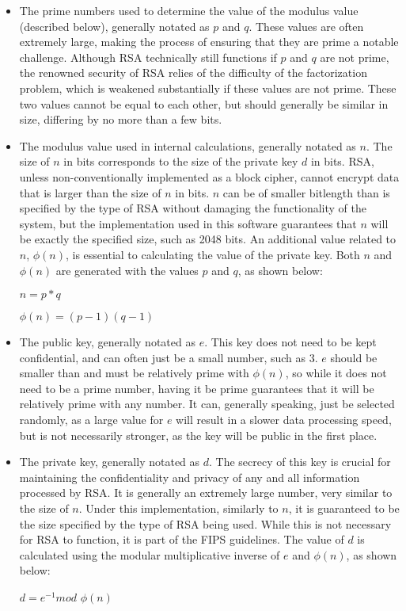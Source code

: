 \documentclass[11pt]{article}
\begin{document}
\begin{itemize}
\item
{
The prime numbers used to determine the value of the modulus value (described below), generally notated as $p$ and $q$. These values are often extremely large, making the process of ensuring that they are prime a notable challenge. Although RSA technically still functions if $p$ and $q$ are not prime, the renowned security of RSA relies of the difficulty of the factorization problem, which is weakened substantially if these values are not prime. These two values cannot be equal to each other, but should generally be similar in size, differing by no more than a few bits.
}
\item
{
The modulus value used in internal calculations, generally notated as $n$. The size of $n$ in bits corresponds to the size of the private key $d$ in bits. RSA, unless non-conventionally implemented as a block cipher, cannot encrypt data that is larger than the size of $n$ in bits. $n$ can be of smaller bitlength than is specified by the type of RSA without damaging the functionality of the system, but the implementation used in this software guarantees that $n$ will be exactly the specified size, such as 2048 bits. An additional value related to $n$, $\phi(n)$, is essential to calculating the value of the private key. Both $n$ and $\phi(n)$ are generated with the values $p$ and $q$, as shown below:
\begin{center}
$n = p * q$

$\phi(n) = (p - 1)(q - 1)$
\end{center}
}

\item
{
The public key, generally notated as $e$. This key does not need to be kept confidential, and can often just be a small number, such as $3$. $e$ should be smaller than and must be relatively prime with $\phi(n)$, so while it does not need to be a prime number, having it be prime guarantees that it will be relatively prime with any number. It can, generally speaking, just be selected randomly, as a large value for $e$ will result in a slower data processing speed, but is not necessarily stronger, as the key will be public in the first place.
}
\item
{
The private key, generally notated as $d$. The secrecy of this key is crucial for maintaining the confidentiality and privacy of any and all information processed by RSA. It is generally an extremely large number, very similar to the size of $n$. Under this implementation, similarly to $n$, it is guaranteed to be the size specified by the type of RSA being used. While this is not necessary for RSA to function, it is part of the FIPS guidelines. The value of $d$ is calculated using the modular multiplicative inverse of $e$ and $\phi(n)$, as shown below:
\begin{center}
$d = e^{-1} mod$ $\phi(n)$

\end{center}
}

\end{itemize}
\end{document}
